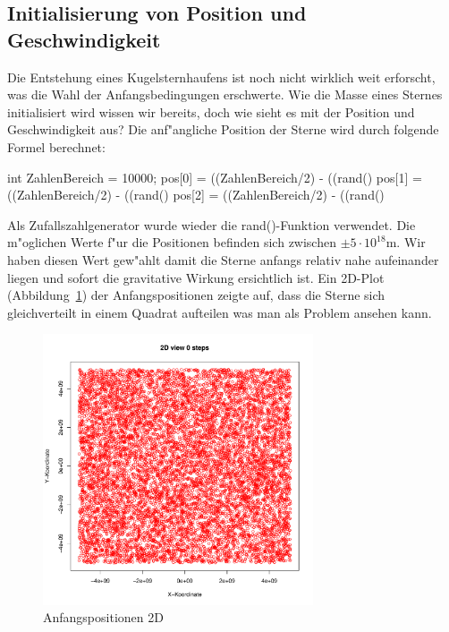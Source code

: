 \begin{refsection}
\subsection{Initialisierung von Position und Geschwindigkeit \label{kugel:subsection:InitPosGesch}}
Die Entstehung eines Kugelsternhaufens ist noch nicht wirklich weit
erforscht, was die Wahl der Anfangsbedingungen erschwerte. Wie die Masse
eines Sternes initialisiert wird wissen wir bereits, doch wie sieht es
mit der Position und Geschwindigkeit aus? Die anf"angliche Position der
Sterne wird durch folgende Formel berechnet:
\begin{Cpp}
int ZahlenBereich = 10000;
pos[0] = ((ZahlenBereich/2) - ((rand()%
pos[1] = ((ZahlenBereich/2) - ((rand()%
pos[2] = ((ZahlenBereich/2) - ((rand()%
\end{Cpp}
Als Zufallszahlgenerator wurde wieder die rand()-Funktion verwendet. Die
m"oglichen Werte f"ur die Positionen befinden sich zwischen $\mathrm{\pm5
\cdot 10^{18} m}$. Wir haben diesen Wert gew"ahlt damit die Sterne anfangs
relativ nahe aufeinander liegen und sofort die gravitative Wirkung
ersichtlich ist. Ein 2D-Plot (Abbildung~\ref{Kugel:Anfangspossition})
der Anfangspositionen zeigte auf, dass die Sterne sich gleichverteilt
in einem Quadrat aufteilen was man als Problem ansehen kann.

\begin{figure}[h!]
	\begin{center}
		\includegraphics[width = 8cm]{kugel/images/2DPosN0.pdf}
	\end{center}
	\caption{Anfangspositionen 2D
	\label{Kugel:Anfangspossition}}
\end{figure}


\end{refsection}
